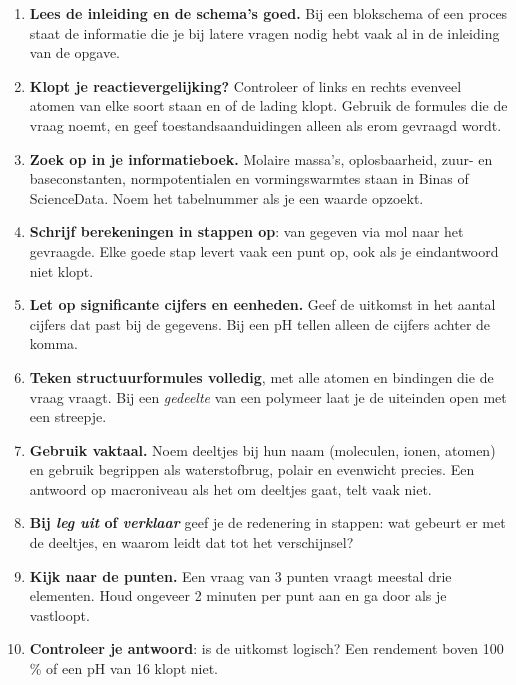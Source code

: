 {\small\opmaakproza
\begin{enumerate}[leftmargin=1.5em,itemsep=3pt,label=\textcolor{kleur1}{\sffamily\bfseries\arabic*}]
\item \textbf{Lees de inleiding en de schema's goed.} Bij een blokschema of een proces staat de informatie die je
  bij latere vragen nodig hebt vaak al in de inleiding van de opgave.
\item \textbf{Klopt je reactievergelijking?} Controleer of links en rechts evenveel atomen van elke soort staan en
  of de lading klopt. Gebruik de formules die de vraag noemt, en geef toestandsaanduidingen alleen als erom gevraagd wordt.
\item \textbf{Zoek op in je informatieboek.} Molaire massa's, oplosbaarheid, zuur- en baseconstanten, normpotentialen
  en vormingswarmtes staan in Binas of ScienceData. Noem het tabelnummer als je een waarde opzoekt.
\item \textbf{Schrijf berekeningen in stappen op}: van gegeven via mol naar het gevraagde. Elke goede stap levert
  vaak een punt op, ook als je eindantwoord niet klopt.
\item \textbf{Let op significante cijfers en eenheden.} Geef de uitkomst in het aantal cijfers dat past bij de gegevens.
  Bij een pH tellen alleen de cijfers achter de komma.
\item \textbf{Teken structuurformules volledig}, met alle atomen en bindingen die de vraag vraagt. Bij een
  \emph{gedeelte} van een polymeer laat je de uiteinden open met een streepje.
\item \textbf{Gebruik vaktaal.} Noem deeltjes bij hun naam (moleculen, ionen, atomen) en gebruik begrippen als
  waterstofbrug, polair en evenwicht precies. Een antwoord op macroniveau als het om deeltjes gaat, telt vaak niet.
\item \textbf{Bij \emph{leg uit} of \emph{verklaar}} geef je de redenering in stappen: wat gebeurt er met de deeltjes,
  en waarom leidt dat tot het verschijnsel?
\item \textbf{Kijk naar de punten.} Een vraag van 3 punten vraagt meestal drie elementen. Houd ongeveer
  2 minuten per punt aan en ga door als je vastloopt.
\item \textbf{Controleer je antwoord}: is de uitkomst logisch? Een rendement boven 100\,\% of een pH van 16 klopt niet.
\end{enumerate}\par}
